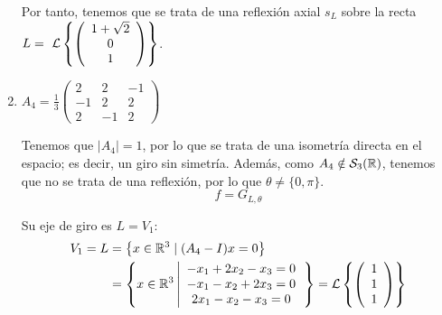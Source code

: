 \begin{ejercicio}
\begin{enumerate}
        Por tanto, tenemos que se trata de una reflexión axial $s_L$ sobre la recta $L=~\mathcal{L}\left\{\left(\begin{array}{c}
                     1+\sqrt{2} \\ 0 \\ 1
                \end{array}\right)\right\}$.





        \item $A_4=\frac{1}{3}\left(\begin{array}{ccc}
            2 & 2 & -1 \\
            -1 & 2 & 2 \\
            2 & -1 & 2
        \end{array}\right)$

        Tenemos que $|A_4|=1$, por lo que se trata de una isometría directa en el espacio; es decir, un giro sin simetría. Además, como $A_4\notin \mathcal{S}_3(\mathbb{R})$, tenemos que no se trata de una reflexión, por lo que $\theta\neq \{0,\pi\}$.
        \begin{equation*}
            f=G_{L,\theta}
        \end{equation*}

        Su eje de giro es $L=V_{1}$:
        \begin{equation*}
            \begin{split}
                V_{1}=L& = \left\{x\in \mathbb{R}^3 \mid (A_4-I)x=0\right\}\\
                & = \left\{x\in \mathbb{R}^3 \left|
                \begin{array}{c}
                    -x_1+2x_2-x_3=0 \\
                    -x_1-x_2+2x_3=0 \\
                    2x_1-x_2-x_3=0
                \end{array}
                \right.\right\}
                = \mathcal{L}\left\{\left(\begin{array}{c}
                     1 \\ 1 \\ 1
                \end{array}\right)\right\}
            \end{split}
        \end{equation*}



\end{enumerate}
\end{ejercicio}
